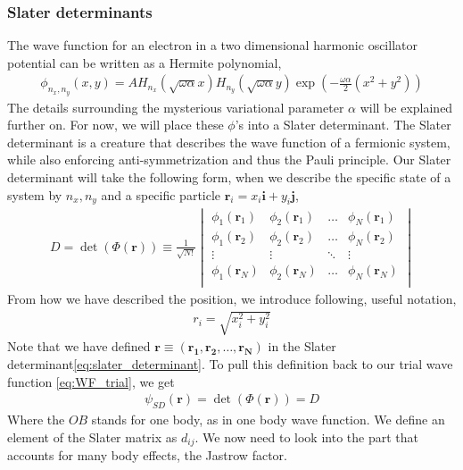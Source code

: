 \documentclass[11pt]{article}
\begin{document}
\subsubsection{Slater determinants}
The wave function for an electron in a two dimensional harmonic oscillator potential can be written as a Hermite polynomial,
\begin{align}
	\phi_{n_x,n_y}(x,y) = AH_{n_x} (\sqrt{\omega\alpha}x) H_{n_y} (\sqrt{\omega\alpha} y) \exp{\left(-\frac{\omega\alpha}{2}\left( x^2 + y^2 \right)\right)}
	\label{eq:sp-wf}
\end{align}
The details surrounding the mysterious variational parameter $\alpha$ will be explained further on. For now, we will place these $\phi$'s into a Slater determinant. The Slater determinant is a creature that describes the wave function of a fermionic system, while also enforcing anti-symmetrization and thus the Pauli principle. Our Slater determinant will take the following form, when we describe the specific state of a system by $n_x, n_y$ and a specific particle $\mathbf{r}_i = x_i\mathbf{i} + y_i\mathbf{j}$,
\begin{align}
	D = \det(\Phi(\mathbf{r})) \equiv \frac{1}{\sqrt{N!}}
	\begin{vmatrix}
		\phi_1(\mathbf{r}_1)	& \phi_2(\mathbf{r}_1) 	& \hdots 	& \phi_N(\mathbf{r}_1) 	\\
		\phi_1(\mathbf{r}_2) 	& \phi_2(\mathbf{r}_2) 	& \hdots 	& \phi_N(\mathbf{r}_2) 	\\
		\vdots 					& \vdots				& \ddots 	& \vdots 				\\
		\phi_1(\mathbf{r}_N) 	& \phi_2(\mathbf{r}_N) 	& \hdots 	& \phi_N(\mathbf{r}_N) 	\\
	\end{vmatrix}
	\label{eq:slater_determinant}
\end{align}
From how we have described the position, we introduce following, useful notation, 
\begin{align}
	r_i = \sqrt{x_i^2 + y_i^2}
	\label{eq:position-length}
\end{align}
Note that we have defined $\mathbf{r} \equiv (\mathbf{r_1},\mathbf{r_2},\dots,\mathbf{r_N})$ in the Slater determinant\eqref{eq:slater_determinant}. To pull this definition back to our trial wave function \eqref{eq:WF_trial}, we get
\begin{align}
	\psi_{SD}(\mathbf{r}) = \det(\Phi(\mathbf{r})) = D
	\label{eq:WF_onebody}
\end{align}
Where the $OB$ stands for one body, as in one body wave function. We define an element of the Slater matrix as $d_{ij}$. We now need to look into the part that accounts for many body effects, the Jastrow factor.
\end{document}
